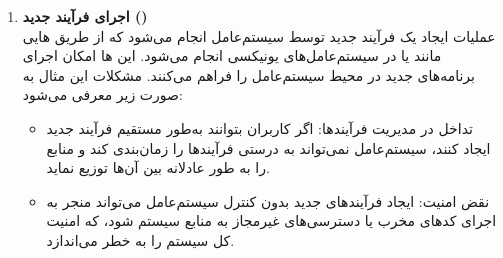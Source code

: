 \begin{qsolve}
\begin{enumerate}
		
		\item 
		\textbf{اجرای فرآیند جدید ()}\\
		عملیات ایجاد یک فرآیند جدید توسط سیستم‌عامل انجام می‌شود که از طریق هایی مانند  یا  در سیستم‌عامل‌های یونیکسی انجام می‌شود. این ها امکان اجرای برنامه‌های جدید در محیط سیستم‌عامل را فراهم می‌کنند. مشکلات این مثال به صورت زیر معرفی می‌شود:
		
		\begin{itemize}
			\item 
			تداخل در مدیریت فرآیندها: اگر کاربران بتوانند به‌طور مستقیم فرآیند جدید ایجاد کنند، سیستم‌عامل نمی‌تواند به درستی فرآیندها را زمان‌بندی کند و منابع را به طور عادلانه بین آن‌ها توزیع نماید.
			
			\item 
			نقض امنیت: ایجاد فرآیندهای جدید بدون کنترل سیستم‌عامل می‌تواند منجر به اجرای کدهای مخرب یا دسترسی‌های غیرمجاز به منابع سیستم شود، که امنیت کل سیستم را به خطر می‌اندازد.
		\end{itemize}
	\end{enumerate}
\end{qsolve}
